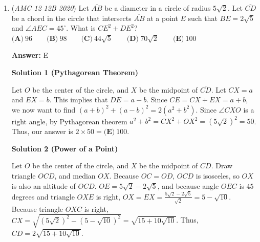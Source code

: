 \begin{enumerate}
 Now, we have to subtract off the six mini-sectors between the triangle and the shaded area. The area of one of these mini-sectors is the difference between a $60^{\circ}$ sector of the semicircle and the equilateral we just drew. The area of a sector is just $\frac{\pi}{6}$, and the area of a triangle is $\frac{\sqrt{3}}{4}.$ Therefore our combined area of the mini-sectors is 
 \[6\left(\frac{\pi}{6} - \frac{\sqrt{3}}{4}\right) = \pi-\frac{3\sqrt{3}}{2}.\]Subtracting this from the area of the (smaller) hexagon, the desired area is 

 
 \[\frac{3\sqrt{3}}{2} -\left(\pi - \frac{3\sqrt{3}}{2}\right) = \boxed{\textbf{(D)} ~3\sqrt{3} - \pi}\]

 -Benedict T (countmath1)

 


	\item (\textit{AMC 12 12B 2020}) Let $\overline{AB}$ be a diameter in a circle of radius $5\sqrt2.$ Let $\overline{CD}$ be a chord in the circle that intersects $\overline{AB}$ at a point $E$ such that $BE=2\sqrt5$ and $\angle AEC = 45^{\circ}.$ What is $CE^2+DE^2?$
$\textbf{(A)}\ 96 \qquad\textbf{(B)}\ 98 \qquad\textbf{(C)}\  44\sqrt5 \qquad\textbf{(D)}\ 70\sqrt2 \qquad\textbf{(E)}\ 100$

 \textbf{Answer: }E



\textbf{Solution 1 (Pythagorean Theorem)}

Let $O$ be the center of the circle, and $X$ be the midpoint of $\overline{CD}$. Let $CX=a$ and $EX=b$. This implies that $DE = a - b$. Since $CE = CX + EX = a + b$, we now want to find $(a+b)^2+(a-b)^2=2(a^2+b^2)$. Since $\angle CXO$ is a right angle, by Pythagorean theorem $a^2 + b^2 = CX^2 + OX^2 = (5\sqrt{2})^2=50$. Thus, our answer is $2\times50=\boxed{\textbf{(E)}\ 100}$. 

 



\textbf{Solution 2 (Power of a Point)}

Let $O$ be the center of the circle, and $X$ be the midpoint of $CD$. Draw triangle $OCD$, and median $OX$. Because $OC = OD$, $OCD$ is isosceles, so $OX$ is also an altitude of $OCD$. $OE = 5\sqrt2 - 2\sqrt5$, and because angle $OEC$ is $45$ degrees and triangle $OXE$ is right, $OX = EX = \frac{5\sqrt2 - 2\sqrt5}{\sqrt2} = 5 - \sqrt{10}$. Because triangle $OXC$ is right, $CX = \sqrt{(5\sqrt2)^2 - (5 - \sqrt{10})^2} = \sqrt{15 + 10\sqrt{10}}$. Thus, $CD = 2\sqrt{15 + 10\sqrt{10}}$. 


\end{enumerate}
